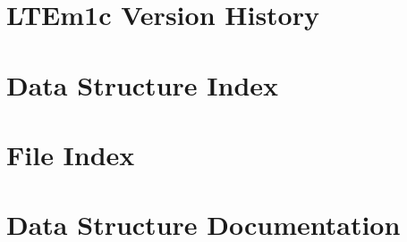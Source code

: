 \let\mypdfximage\pdfximage\def\pdfximage{\immediate\mypdfximage}\documentclass[twoside]{book}
\newcommand{\+}{\discretionary{\mbox{\scriptsize$\hookleftarrow$}}{}{}}
\begin{document}
\chapter{L\+T\+Em1c Version History}
\label{md_version-history}

\chapter{Data Structure Index}

\chapter{File Index}

\chapter{Data Structure Documentation}




































\end{document}
